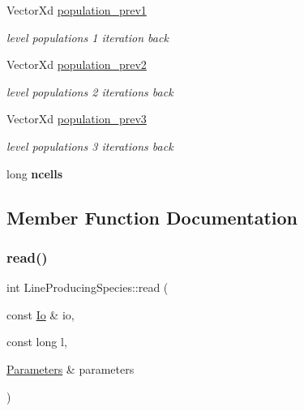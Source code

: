\begin{DoxyCompactItemize}
\mbox{\label{structLineProducingSpecies_a6361b08c8cbae2ea1b0ff7426b65612c}} 
Vector\+Xd \mbox{\hyperlink{structLineProducingSpecies_a6361b08c8cbae2ea1b0ff7426b65612c}{population\+\_\+prev1}}
\begin{DoxyCompactList}\small\item\em level populations 1 iteration back \end{DoxyCompactList}\item 
\mbox{\label{structLineProducingSpecies_a941e0dedc5739b8363fc3828f69c00a9}} 
Vector\+Xd \mbox{\hyperlink{structLineProducingSpecies_a941e0dedc5739b8363fc3828f69c00a9}{population\+\_\+prev2}}
\begin{DoxyCompactList}\small\item\em level populations 2 iterations back \end{DoxyCompactList}\item 
\mbox{\label{structLineProducingSpecies_a582e0d0d9b4fe273eaa35d97e3dcfe3e}} 
Vector\+Xd \mbox{\hyperlink{structLineProducingSpecies_a582e0d0d9b4fe273eaa35d97e3dcfe3e}{population\+\_\+prev3}}
\begin{DoxyCompactList}\small\item\em level populations 3 iterations back \end{DoxyCompactList}\item 
\mbox{\label{structLineProducingSpecies_a5f1fceaadee40ff4df0569b44b615f39}} 
long {\bfseries ncells}
\end{DoxyCompactItemize}


\subsection{Member Function Documentation}
\mbox{\label{structLineProducingSpecies_a682268d3085f8ca3d24b278df757f141}} 
\subsubsection{\texorpdfstring{read()}{read()}}
{\footnotesize\ttfamily int Line\+Producing\+Species\+::read (\begin{DoxyParamCaption}\item[{const \mbox{\hyperlink{structIo}{Io}} \&}]{io,  }\item[{const long}]{l,  }\item[{\mbox{\hyperlink{classParameters}{Parameters}} \&}]{parameters }\end{DoxyParamCaption})}

